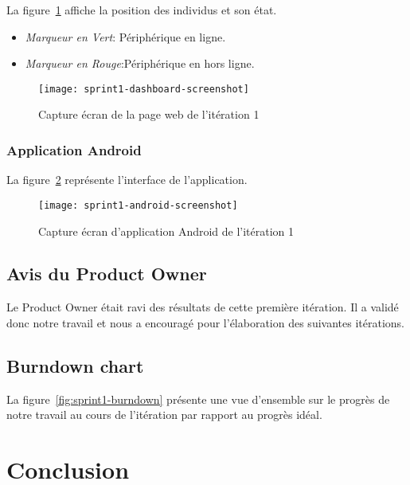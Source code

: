 La figure~\ref{fig:sprint1-dashboard-screenshot} affiche la position des
individus et son état.

\begin{itemize}
    \item \textit{Marqueur en Vert}: Périphérique en ligne.
    \item \textit{Marqueur en Rouge}:Périphérique en hors ligne.
\end{itemize}

\begin{figure}[htbp]
    \centering
    \texttt{[image: sprint1-dashboard-screenshot]}
    \caption{Capture écran de la page web de l'itération 1}
\label{fig:sprint1-dashboard-screenshot}
\end{figure}

\subsubsection{Application Android}

La figure~\ref{fig:sprint1-android-screenshot} représente l'interface de
l'application.

\begin{figure}[htbp]
    \centering
    \texttt{[image: sprint1-android-screenshot]}
    \caption{Capture écran d'application Android de l'itération 1}
\label{fig:sprint1-android-screenshot}
\end{figure}

\subsection{Avis du Product Owner}

Le Product Owner était ravi des résultats de cette première itération. Il a
validé donc notre travail et nous a encouragé pour l'élaboration des suivantes
itérations.

\subsection{Burndown chart}

La figure~\ref{fig:sprint1-burndown} présente une vue d'ensemble sur le progrès
de notre travail au cours de l'itération par rapport au progrès idéal.



\section*{Conclusion}

